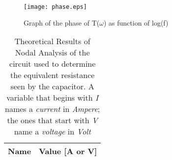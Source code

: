 \begin{figure}[h] \centering
  \texttt{[image: phase.eps]}
  \caption{Graph of the phase  of T($\omega$) as function of log(f) }
  \label{fig:argT}
\end{figure}


\begin{table}
  \parbox{.45\linewidth}{
    \centering
    \begin{tabular}{|c|c|}
      \hline
      {\bf Name} & {\bf Value [A or V]} \\ \hline
      
    \end{tabular}
    \label{tab:TheoreticalResults}
    \caption{Theoretical Results of Nodal Analysis of the circuit used to determine the equivalent resistance seen by the capacitor. A variable that begins  with \textit{I} names a \textit{current} in \textit{Ampere}; the ones that start with \textit{V} name a \textit{voltage} in \textit{Volt} }
  }
  \hfill
\end{table}






